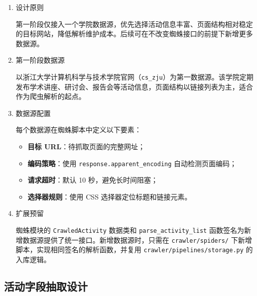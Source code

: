 \documentclass[UTF8,a4paper,12pt,fontset=none]{ctexrep}
\providecommand{\tightlist}{}
\begin{document}
\begin{enumerate}
\def\labelenumi{\arabic{enumi}.}
\item
  设计原则

  第一阶段仅接入一个学院数据源，优先选择活动信息丰富、页面结构相对稳定的目标网站，降低解析维护成本。后续可在不改变蜘蛛接口的前提下新增更多数据源。
\item
  第一阶段数据源

  以浙江大学计算机科学与技术学院官网（\texttt{cs\_zju}）为第一数据源。该学院定期发布学术讲座、研讨会、报告会等活动信息，页面结构以链接列表为主，适合作为爬虫解析的起点。
\item
  数据源配置

  每个数据源在蜘蛛脚本中定义以下要素：

  \begin{itemize}
  \tightlist
  \item
    \textbf{目标 URL}：待抓取页面的完整网址；
  \item
    \textbf{编码策略}：使用 \texttt{response.apparent\_encoding} 自动检测页面编码；
  \item
    \textbf{请求超时}：默认 10 秒，避免长时间阻塞；
  \item
    \textbf{选择器规则}：使用 CSS 选择器定位标题和链接元素。
  \end{itemize}
\item
  扩展预留

  蜘蛛模块的 \texttt{CrawledActivity} 数据类和 \texttt{parse\_activity\_list} 函数签名为新增数据源提供了统一接口。新增数据源时，只需在 \texttt{crawler/spiders/} 下新增脚本，实现相同签名的解析函数，并复用 \texttt{crawler/pipelines/storage.py} 的入库逻辑。
\end{enumerate}

\subsection{活动字段抽取设计}\label{ux6d3bux52a8ux5b57ux6bb5ux62bdux53d6ux8bbeux8ba1}
\end{document}
